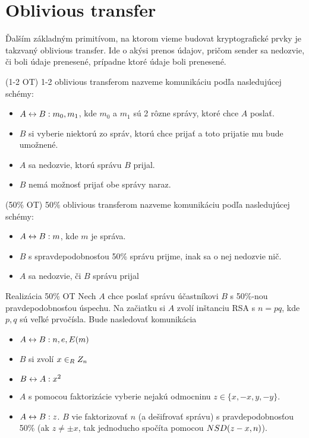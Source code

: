 \section{Oblivious transfer}

Ďalším základným primitívom, na ktorom vieme budovat kryptografické
prvky je takzvaný oblivious transfer. Ide o akýsi prenos údajov,
pričom sender sa nedozvie, či boli údaje prenesené, prípadne ktoré
údaje boli prenesené.

\begin{definicia}{(1-2 OT)}
    1-2 oblivious transferom nazveme komunikáciu podľa nasledujúcej
    schémy:
    \begin{itemize}
        \item $A \leftrightarrow B: m_0, m_1$, kde $m_0$ a $m_1$ sú 2 rôzne
        správy, ktoré chce $A$ poslať.
        \item $B$ si vyberie niektorú zo správ, ktorú chce prijať a
        toto prijatie mu bude umožnené.
        \item $A$ sa nedozvie, ktorú správu $B$ prijal.
        \item $B$ nemá možnosť prijať obe správy naraz.        
    \end{itemize}
\end{definicia}

\begin{definicia}{(50\% OT)}
    50\% oblivious transferom nazveme komunikáciu podľa nasledujúcej
    schémy:
    \begin{itemize}
        \item $A \leftrightarrow B: m$, kde $m$ je správa.
        \item $B$ s spravdepodobnosťou 50\% správu prijme, inak sa o
        nej nedozvie nič.
        \item $A$ sa nedozvie, či $B$ správu prijal
    \end{itemize}
\end{definicia}

\begin{priklad}{Realizácia 50\% OT}
    Nech $A$ chce poslať správu účastníkovi $B$ s 50\%-nou
    pravdepodobnosťou úspechu. Na začiatku si $A$ zvolí inštanciu RSA
    s $n=pq$, kde $p,q$ sú veľké prvočísla. Bude nasledovať
    komunikácia
 \begin{itemize}
    \compactlist
    \item $A \leftrightarrow B: n,e,E(m)$ 
    \item $B$ si zvolí $x \in_{R} Z_n$
    \item $B \leftrightarrow A: x^2$
    \item $A$ s pomocou faktorizácie vyberie nejakú odmocninu $z \in
    \{x,-x,y,-y\}$.
    \item $A \leftrightarrow B: z$.
    $B$ vie faktorizovať $n$ (a dešifrovať správu) s
    pravdepodobnosťou 50\% (ak $z \not = \pm x$, tak jednoducho
    spočíta pomocou $NSD(z-x, n)$).
 \end{itemize} 
\end{priklad}

